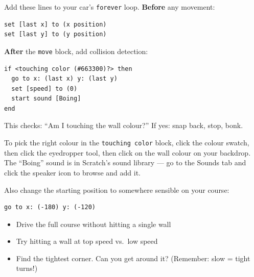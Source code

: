 \documentclass[11pt,a4paper]{article}
\begin{document}
Add these lines to your car's \texttt{forever} loop. \textbf{Before} any movement:

\begin{scratchblockbox}
\begin{lstlisting}[style=scratch]
set [last x] to (x position)
set [last y] to (y position)
\end{lstlisting}
\end{scratchblockbox}

\textbf{After} the \texttt{move} block, add collision detection:

\begin{scratchblockbox}
\begin{lstlisting}[style=scratch]
if <touching color (#663300)?> then
  go to x: (last x) y: (last y)
  set [speed] to (0)
  start sound [Boing]
end
\end{lstlisting}
\end{scratchblockbox}

This checks: ``Am I touching the wall colour?'' If yes: snap back, stop, bonk.

\begin{parentbox}
To pick the right colour in the \texttt{touching color} block, click the colour swatch, then click the eyedropper tool, then click on the wall colour on your backdrop. The ``Boing'' sound is in Scratch's sound library --- go to the Sounds tab and click the speaker icon to browse and add it.
\end{parentbox}

Also change the starting position to somewhere sensible on your course:

\begin{scratchblockbox}
\begin{lstlisting}[style=scratch]
go to x: (-180) y: (-120)
\end{lstlisting}
\end{scratchblockbox}

\begin{challengebox}
\begin{itemize}[nosep]
  \item Drive the full course without hitting a single wall
  \item Try hitting a wall at top speed vs.\ low speed
  \item Find the tightest corner. Can you get around it? (Remember: slow = tight turns!)
\end{itemize}
\end{challengebox}
\end{document}
